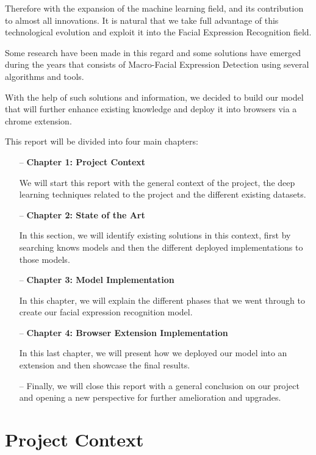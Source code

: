 \documentclass[12pt,a4paper,oneside,english]{book}
\begin{document}
Therefore with the expansion of the machine learning field, and its contribution to almost all innovations. It is natural that we take full advantage of this technological evolution and exploit it into the Facial Expression Recognition field.

Some research have been made in this regard and some solutions have emerged during the years that consists of Macro-Facial Expression Detection using several algorithms and tools.

With the help of such solutions and information, we decided to build our model that will further enhance existing knowledge and deploy it into browsers via a chrome extension.

This report will be divided into four main chapters:
\begin{itemize}
\item[--] \textbf{Chapter 1: Project Context}

We will start this report with the general context of the project, the deep learning techniques related to the project and the different existing datasets.

\item[--] \textbf{Chapter 2: State of the Art}

In this section, we will identify existing solutions in this context, first by searching knows models and then the different deployed implementations to those models.

\item[--] \textbf{Chapter 3: Model Implementation}

In this chapter, we will explain the different phases that we went through to create our facial expression recognition model.

\item[--] \textbf{Chapter 4: Browser Extension Implementation}

In this last chapter, we will present how we deployed our model into an extension and then showcase the final results.

\item[--] Finally, we will close this report with a general conclusion on our project and opening a new perspective for further amelioration and upgrades.
\end{itemize}

\chapter{Project Context}
\label{ch:1er}
\minitoc
\newpage
\end{document}
